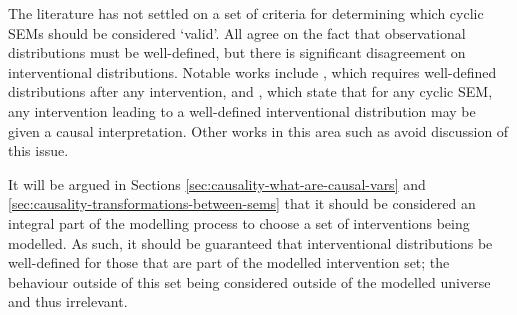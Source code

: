 
The literature has not settled on a set of criteria for determining which cyclic SEMs should be considered `valid'. 
All agree on the fact that observational distributions must be well-defined, but there is significant disagreement on interventional distributions.
Notable works include \cite{hyttinen2010causal}, which requires well-defined distributions after any intervention, and \cite{mooij2011causal}, which state that for any cyclic SEM, any intervention leading to a well-defined interventional distribution may be given a causal interpretation. Other works in this area such as \cite{lacerda2012discovering} avoid discussion of this issue.

It will be argued in Sections \ref{sec:causality-what-are-causal-vars} and \ref{sec:causality-transformations-between-sems} that it should be considered an integral part of the modelling process to choose a set of interventions being modelled. As such, it should be guaranteed that interventional distributions be well-defined for those that are part of the modelled intervention set; the behaviour outside of this set being considered outside of the modelled universe and thus irrelevant.


